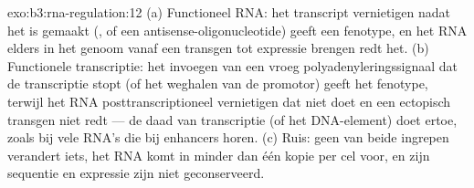 \begin{solution}{exo:b3:rna-regulation:12}
(a) Functioneel RNA: het transcript vernietigen nadat het is gemaakt
(, of een antisense-oligonucleotide) geeft een fenotype, en het RNA
elders in het genoom vanaf een transgen tot expressie brengen redt het.
(b) Functionele transcriptie: het invoegen van een vroeg
polyadenyleringssignaal dat de transcriptie stopt (of het weghalen van
de promotor) geeft het fenotype, terwijl het RNA posttranscriptioneel
vernietigen dat niet doet en een ectopisch transgen niet redt --- de
daad van transcriptie (of het DNA-element) doet ertoe, zoals bij vele
RNA's die bij enhancers horen. (c) Ruis: geen van beide ingrepen
verandert iets, het RNA komt in minder dan één kopie per cel voor, en
zijn sequentie en expressie zijn niet geconserveerd.
\end{solution}

